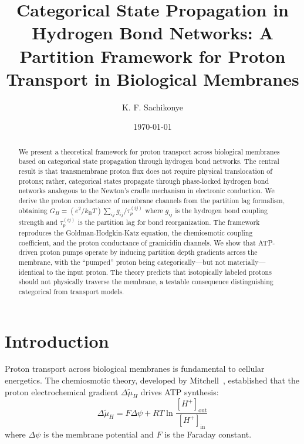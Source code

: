 \documentclass[twocolumn,showpacs,preprintnumbers,amsmath,amssymb,prd]{revtex4-2}
\newcommand{\taup}{\tau_p}
\newcommand{\kB}{k_{\text{B}}}
\begin{document}
\title{Categorical State Propagation in Hydrogen Bond Networks: A Partition Framework for Proton Transport in Biological Membranes}

\author{K. F. Sachikonye}

\date{\today}

\begin{abstract}
We present a theoretical framework for proton transport across biological membranes based on categorical state propagation through hydrogen bond networks. The central result is that transmembrane proton flux does not require physical translocation of protons; rather, categorical states propagate through phase-locked hydrogen bond networks analogous to the Newton's cradle mechanism in electronic conduction. We derive the proton conductance of membrane channels from the partition lag formalism, obtaining $G_H = (e^2/\kB T)\sum_{ij}g_{ij}/\taup^{(ij)}$ where $g_{ij}$ is the hydrogen bond coupling strength and $\taup^{(ij)}$ is the partition lag for bond reorganization. The framework reproduces the Goldman-Hodgkin-Katz equation, the chemiosmotic coupling coefficient, and the proton conductance of gramicidin channels. We show that ATP-driven proton pumps operate by inducing partition depth gradients across the membrane, with the ``pumped'' proton being categorically---but not materially---identical to the input proton. The theory predicts that isotopically labeled protons should not physically traverse the membrane, a testable consequence distinguishing categorical from transport models.
\end{abstract}


\maketitle

\section{Introduction}
\label{sec:introduction}

Proton transport across biological membranes is fundamental to cellular energetics. The chemiosmotic theory, developed by Mitchell~\cite{Mitchell1961}, established that the proton electrochemical gradient $\Delta\tilde{\mu}_H$ drives ATP synthesis:
\begin{equation}
\Delta\tilde{\mu}_H = F\Delta\psi + RT\ln\frac{[H^+]_{\text{out}}}{[H^+]_{\text{in}}}
\label{eq:electrochemical}
\end{equation}
where $\Delta\psi$ is the membrane potential and $F$ is the Faraday constant.
\end{document}
